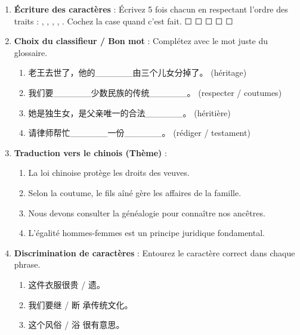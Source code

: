 \documentclass[11pt]{article}
\newcommand{\zh}[1]{\ifmmode\text{#1}\else{#1}\fi}
\begin{document}
\begin{exercice}
\begin{enumerate}
\item \textbf{Écriture des caractères} : Écrivez 5 fois chacun en respectant l'ordre des traits : \zh{承}, \zh{法}, \zh{家}, \zh{继}, \zh{遗}. Cochez la case quand c'est fait. ☐ ☐ ☐ ☐ ☐
\item \textbf{Choix du classifieur / Bon mot} : Complétez avec le mot juste du glossaire.
\begin{enumerate}
\item 老王去世了，他的\_\_\_\_\_\_由三个儿女分掉了。 (héritage)
\item 我们要\_\_\_\_\_\_少数民族的传统\_\_\_\_\_\_。 (respecter / coutumes)
\item 她是独生女，是父亲唯一的合法\_\_\_\_\_\_。 (héritière)
\item 请律师帮忙\_\_\_\_\_\_一份\_\_\_\_\_\_。 (rédiger / testament)
\end{enumerate}
\item \textbf{Traduction vers le chinois (Thème)} :
\begin{enumerate}
\item La loi chinoise protège les droits des veuves.
\item Selon la coutume, le fils aîné gère les affaires de la famille.
\item Nous devons consulter la généalogie pour connaître nos ancêtres.
\item L'égalité hommes-femmes est un principe juridique fondamental.
\end{enumerate}
\item \textbf{Discrimination de caractères} : Entourez le caractère correct dans chaque phrase.
\begin{enumerate}
\item 这件衣服很贵 / 遗。
\item 我们要继 / 断 承传统文化。
\item 这个风俗 / 浴 很有意思。
\end{enumerate}
\end{enumerate}
\end{exercice}
\end{document}
